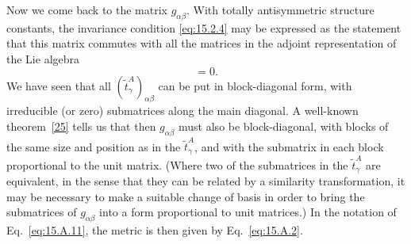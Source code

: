 Now we come back to the matrix $g_{\alpha\beta}$. With totally antisymmetric structure constants, the invariance condition \eqref{eq:15.2.4} may be expressed as the statement that this matrix commutes with all the matrices in the adjoint representation of the Lie algebra
\begin{equation}
 [g,\widetilde t^A_\gamma]=0.
 \tag{15.A.14}\label{eq:15.A.14}
\end{equation}
We have seen that all $(\widetilde t^A_\gamma)_{\alpha\beta}$ can be put in block-diagonal form, with irreducible (or zero) submatrices along the main diagonal. A well-known theorem~\hyperref[ch15-ref-25]{[25]} tells us that then $g_{\alpha\beta}$ must also be block-diagonal, with blocks of the same size and position as in the $\widetilde t^A_\gamma$, and with the submatrix in each block proportional to the unit matrix. (Where two of the submatrices in the $\widetilde t^A_\gamma$ are equivalent, in the sense that they can be related by a similarity transformation, it may be necessary to make a suitable change of basis in order to bring the submatrices of $g_{\alpha\beta}$ into a form proportional to unit matrices.) In the notation of Eq.~\eqref{eq:15.A.11}, the metric is then given by Eq.~\eqref{eq:15.A.2}.
